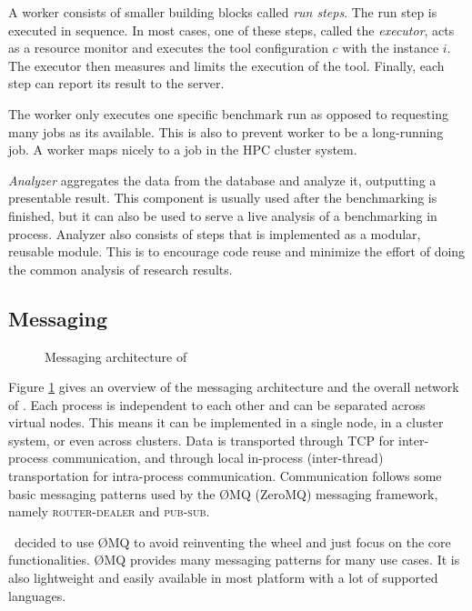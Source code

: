 A worker consists of smaller building blocks called \emph{run steps}.
The run step is executed in sequence.
In most cases, one of these steps, called the \emph{executor}, acts as a resource monitor and executes the tool configuration $c$ with the instance $i$.
The executor then measures and limits the execution of the tool.
Finally, each step can report its result to the server.

The worker only executes one specific benchmark run as opposed to requesting many jobs as its available.
This is also to prevent worker to be a long-running job.
A worker maps nicely to a job in the HPC cluster system.

\emph{Analyzer} aggregates the data from the database and analyze it, outputting a presentable result.
This component is usually used after the benchmarking is finished, but it can also be used to serve a live analysis of a benchmarking in process.
Analyzer also consists of steps that is implemented as a modular, reusable module.
This is to encourage code reuse and minimize the effort of doing the common analysis of research results.


\subsection{Messaging}
\label{sec:impl.messaging}

\begin{figure}
    \caption{Messaging architecture of \OurBenchmarkingTool}
    \label{fig:zmq}
\end{figure}

Figure \ref{fig:zmq} gives an overview of the messaging architecture and the overall network of \OurBenchmarkingTool.
Each process is independent to each other and can be separated across virtual nodes.
This means it can be implemented in a single node, in a cluster system, or even across clusters.
Data is transported through TCP for inter-process communication, and through local in-process (inter-thread) transportation for intra-process communication.
Communication follows some basic messaging patterns used by the \O MQ (ZeroMQ) messaging framework, namely \textsc{router-dealer} and \textsc{pub-sub}.

\First~decided to use \O MQ to avoid reinventing the wheel and just focus on the core functionalities.
\O MQ provides many messaging patterns for many use cases.
It is also lightweight and easily available in most platform with a lot of supported languages.

